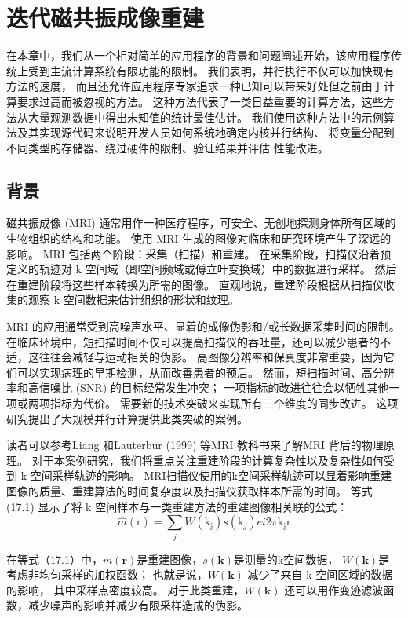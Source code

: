 \section{迭代磁共振成像重建}
在本章中，我们从一个相对简单的应用程序的背景和问题阐述开始，该应用程序传统上受到主流计算系统有限功能的限制。 
我们表明，并行执行不仅可以加快现有方法的速度，
而且还允许应用程序专家追求一种已知可以带来好处但之前由于计算要求过高而被忽视的方法。 
这种方法代表了一类日益重要的计算方法，这些方法从大量观测数据中得出未知值的统计最佳估计。 
我们使用这种方法中的示例算法及其实现源代码来说明开发人员如何系统地确定内核并行结构、
将变量分配到不同类型的存储器、绕过硬件的限制、验证结果并评估 性能改进。

\subsection{背景}
磁共振成像 (MRI) 通常用作一种医疗程序，可安全、无创地探测身体所有区域的生物组织的结构和功能。 
使用 MRI 生成的图像对临床和研究环境产生了深远的影响。 MRI 包括两个阶段：采集（扫描）和重建。 
在采集阶段，扫描仪沿着预定义的轨迹对 k 空间域（即空间频域或傅立叶变换域）中的数据进行采样。 
然后在重建阶段将这些样本转换为所需的图像。 直观地说，重建阶段根据从扫描仪收集的观察 k 空间数据来估计组织的形状和纹理。

MRI 的应用通常受到高噪声水平、显着的成像伪影和/或长数据采集时间的限制。 
在临床环境中，短扫描时间不仅可以提高扫描仪的吞吐量，还可以减少患者的不适，这往往会减轻与运动相关的伪影。 
高图像分辨率和保真度非常重要，因为它们可以实现病理的早期检测，从而改善患者的预后。 
然而，短扫描时间、高分辨率和高信噪比 (SNR) 的目标经常发生冲突； 一项指标的改进往往会以牺牲其他一项或两项指标为代价。 
需要新的技术突破来实现所有三个维度的同步改进。 这项研究提出了大规模并行计算提供此类突破的案例。

读者可以参考Liang 和Lauterbur (1999) 等MRI 教科书来了解MRI 背后的物理原理。 
对于本案例研究，我们将重点关注重建阶段的计算复杂性以及复杂性如何受到 k 空间采样轨迹的影响。 
MRI扫描仪使用的k空间采样轨迹可以显着影响重建图像的质量、重建算法的时间复杂度以及扫描仪获取样本所需的时间。 
等式 (17.1) 显示了将 k 空间样本与一类重建方法的重建图像相关联的公式：
$$
\widehat{m}(\mathrm{r})=\sum_{j} W\left(\mathrm{k}_{\mathrm{j}}\right) s\left(\mathrm{k}_{j }\right) e i 2 \pi \mathrm{k}_{\mathrm{j}} \mathrm{r}
$$

在等式（17.1）中，$m(\mathbf{r})$是重建图像，$s(\mathbf{k})$是测量的k空间数据，
$W(\mathbf{k})$是 考虑非均匀采样的加权函数； 也就是说，$W(\mathbf{k})$ 减少了来自 k 空间区域的数据的影响，
其中采样点密度较高。 对于此类重建，$W(\mathbf{k})$ 还可以用作变迹滤波函数，减少噪声的影响并减少有限采样造成的伪影。


